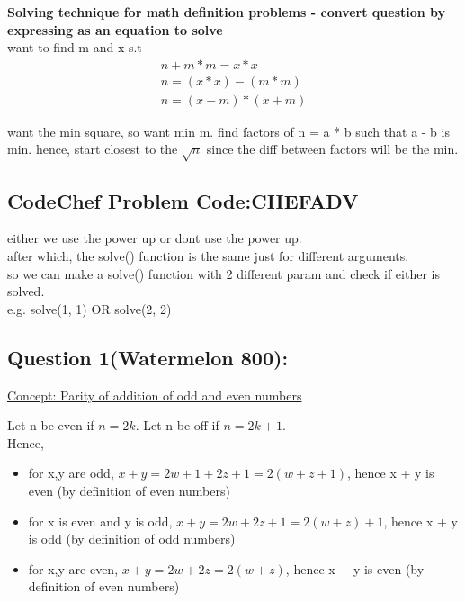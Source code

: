 \documentclass[12pt]{article}
\begin{document}
{\textbf{Solving technique for math definition problems - convert question by expressing as an equation to solve}} \\
want to find m and x s.t 
\begin{align}
	n + m * m = x * x \\
	n = (x * x) - (m * m) \\
	n = (x - m) * (x + m) 
 \end{align} 
 
 want the min square, so want min m. 
 find factors of n = a * b such that a - b is min. 
 hence, start closest to the \(\sqrt{n}\) since the diff between factors will be the min. 
 
 \subsection{CodeChef Problem Code:CHEFADV} 
 either we use the power up or dont use the power up. \\
 after which, the solve() function is the same just for different arguments. \\
 so we can make a solve() function with 2 different param and check if either is solved. \\
 e.g. solve(1, 1) OR solve(2, 2)

\subsection{Question 1(Watermelon 800):}  

{\underline{Concept: Parity of addition of odd and even numbers}}  

Let n be even if \( n = 2k \). 
Let n be off if \( n = 2k + 1 \). \\ [\baselineskip]

Hence, 

\begin{itemize} 
	\item for x,y are odd, \(x + y = 2w + 1 + 2z + 1 = 2(w + z + 1)\), hence x + y is even (by definition of even numbers) 
	\item for x is even and y is odd, \( x + y = 2w + 2z + 1 = 2(w + z) + 1\), hence x + y is odd (by definition of odd numbers) 
	\item for x,y are even, \( x + y = 2w + 2z = 2(w + z)\), hence x + y is even (by definition of even numbers) \\ [\baselineskip]
 \end{itemize} 
 
 
\end{document}
